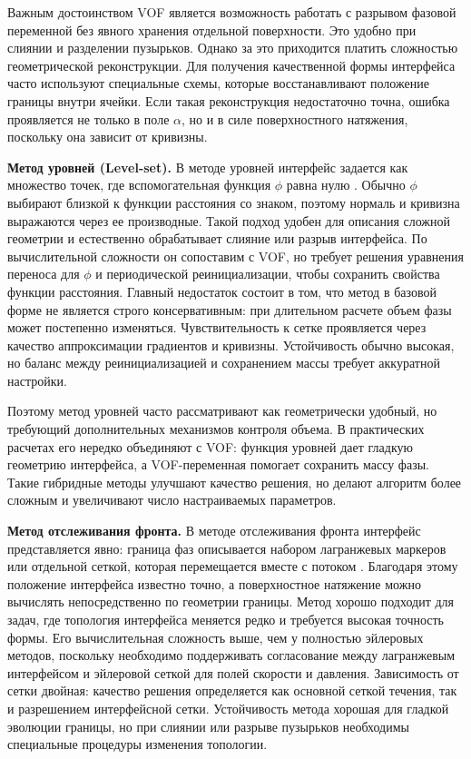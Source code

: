 \documentclass[12pt,a4paper]{article}
\begin{document}
Важным достоинством VOF является возможность работать с разрывом фазовой
переменной без явного хранения отдельной поверхности. Это удобно при слиянии и
разделении пузырьков. Однако за это приходится платить сложностью
геометрической реконструкции. Для получения качественной формы интерфейса часто
используют специальные схемы, которые восстанавливают положение границы внутри
ячейки. Если такая реконструкция недостаточно точна, ошибка проявляется не
только в поле \(\alpha\), но и в силе поверхностного натяжения, поскольку она
зависит от кривизны.

\textbf{Метод уровней (Level-set).}
В методе уровней интерфейс задается как множество точек, где вспомогательная
функция \(\phi\) равна нулю \cite{Osher1988}. Обычно \(\phi\) выбирают близкой
к функции расстояния со знаком, поэтому нормаль и кривизна выражаются через ее
производные. Такой подход удобен для описания сложной геометрии и естественно
обрабатывает слияние или разрыв интерфейса. По вычислительной сложности он
сопоставим с VOF, но требует решения уравнения переноса для \(\phi\) и
периодической реинициализации, чтобы сохранить свойства функции расстояния.
Главный недостаток состоит в том, что метод в базовой форме не является строго
консервативным: при длительном расчете объем фазы может постепенно изменяться.
Чувствительность к сетке проявляется через качество аппроксимации градиентов и
кривизны. Устойчивость обычно высокая, но баланс между реинициализацией и
сохранением массы требует аккуратной настройки.

Поэтому метод уровней часто рассматривают как геометрически удобный, но
требующий дополнительных механизмов контроля объема. В практических расчетах
его нередко объединяют с VOF: функция уровней дает гладкую геометрию
интерфейса, а VOF-переменная помогает сохранить массу фазы. Такие гибридные
методы улучшают качество решения, но делают алгоритм более сложным и
увеличивают число настраиваемых параметров.

\textbf{Метод отслеживания фронта.}
В методе отслеживания фронта интерфейс представляется явно: граница фаз описывается набором
лагранжевых маркеров или отдельной сеткой, которая перемещается вместе с
потоком \cite{Tryggvason2001}. Благодаря этому положение интерфейса известно
точно, а поверхностное натяжение можно вычислять непосредственно по геометрии
границы. Метод хорошо подходит для задач, где топология интерфейса меняется
редко и требуется высокая точность формы. Его вычислительная сложность выше,
чем у полностью эйлеровых методов, поскольку необходимо поддерживать согласование
между лагранжевым интерфейсом и эйлеровой сеткой для полей скорости и давления.
Зависимость от сетки двойная: качество решения определяется как основной
сеткой течения, так и разрешением интерфейсной сетки. Устойчивость метода
хорошая для гладкой эволюции границы, но при слиянии или разрыве пузырьков
необходимы специальные процедуры изменения топологии.
\end{document}
